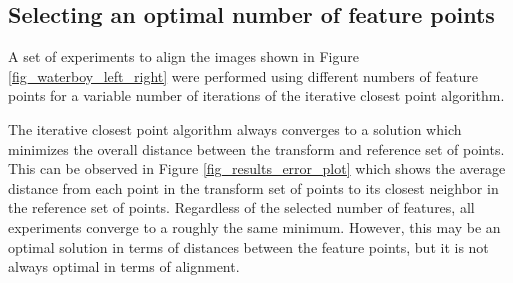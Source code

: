 \documentclass{article}
\begin{document}
\subsection{Selecting an optimal number of feature points}

A set of experiments to align the images shown in Figure \ref{fig_waterboy_left_right} were performed using different numbers of feature points for a variable number of iterations of the iterative closest point algorithm.

The iterative closest point algorithm always converges to a solution which minimizes the overall distance between the transform and reference set of points. This can be observed in Figure \ref{fig_results_error_plot} which shows the average distance from each point in the transform set of points to its closest neighbor in the reference set of points. Regardless of the selected number of features, all experiments converge to a roughly the same minimum. However, this may be an optimal solution in terms of distances between the feature points, but it is not always optimal in terms of alignment. 
\end{document}
